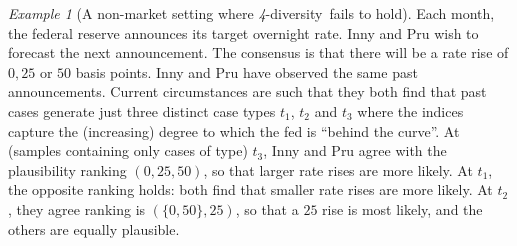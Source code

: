 \documentclass[ecta,nameyear,draft]{econsocart}
\newcommand{\fourdiv}{\textit{4}-\textup{diversity}}
\theoremstyle{plain}
\theoremstyle{remark}
\newtheorem{example}{Example}%
\begin{document}
\begin{example}[A non-market setting where \fourdiv\ fails to hold]
  \label{eg-rates} Each month, the federal reserve announces its target
  overnight rate.  Inny and {Pru} wish to forecast the next announcement. The
  consensus is that there will be a rate rise of ${0}, {25}$ or ${50}$ basis
  points.  Inny and {Pru} have observed the same past announcements.  Current
  circumstances are such that they both find that past cases generate just
  three distinct case types $t_1$, $t_2$ and $t_3$ where the indices capture
  the (increasing) degree to which the fed is ``behind the curve''.  At
  (samples containing only cases of type) $t_3$, Inny and {Pru} agree with the
  plausibility ranking $\left({0}, {25}, {50}\right)$, so that larger rate
  rises are more likely.  At $t_1$, the opposite ranking holds: both find that
  smaller rate rises are more likely. At $t_2$, they agree ranking is
  $\left(\{{0}, {50}\}, {25}\right)$, so that a ${25}$ rise is most likely, and
  the others are equally plausible. 
 

\end{example}
\end{document}
